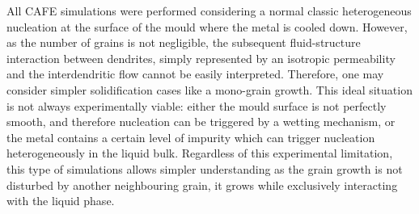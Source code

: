 All CAFE simulations were performed considering a normal classic heterogeneous nucleation at 
the surface of the mould where the metal is cooled down. However, as the number of grains is
not negligible, the subsequent fluid-structure interaction between dendrites, simply represented by an isotropic permeability 
and the interdendritic flow cannot be easily interpreted. Therefore, one may consider simpler solidification cases 
like a mono-grain growth. This ideal situation is not always experimentally viable: either the mould surface is not 
perfectly smooth, and therefore nucleation can be triggered by a wetting mechanism, or the metal contains a certain level of impurity
which can trigger nucleation heterogeneously in the liquid bulk. 
Regardless of this experimental limitation, this type of simulations allows simpler understanding as the grain growth is not 
disturbed by another neighbouring grain, it grows while exclusively interacting with the liquid phase.


